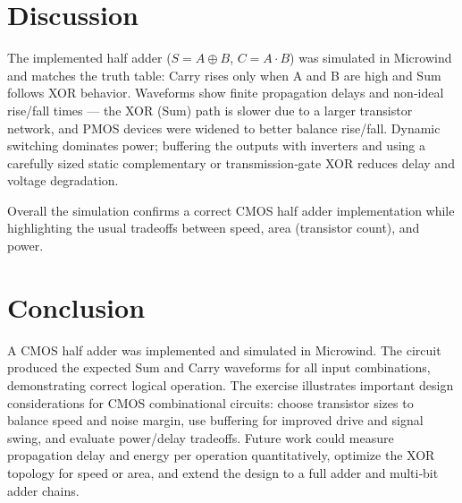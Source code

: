 \documentclass[12pt]{article}
\begin{document}
\section*{Discussion}
The implemented half adder ($S=A\oplus B$, $C=A\cdot B$) was simulated in Microwind and matches the truth table: Carry rises only when A and B are high and Sum follows XOR behavior. Waveforms show finite propagation delays and non‑ideal rise/fall times — the XOR (Sum) path is slower due to a larger transistor network, and PMOS devices were widened to better balance rise/fall. Dynamic switching dominates power; buffering the outputs with inverters and using a carefully sized static complementary or transmission‑gate XOR reduces delay and voltage degradation.

Overall the simulation confirms a correct CMOS half adder implementation while highlighting the usual tradeoffs between speed, area (transistor count), and power.

\section*{Conclusion}
A CMOS half adder was implemented and simulated in Microwind. The circuit produced the expected Sum and Carry waveforms for all input combinations, demonstrating correct logical operation. The exercise illustrates important design considerations for CMOS combinational circuits: choose transistor sizes to balance speed and noise margin, use buffering for improved drive and signal swing, and evaluate power/delay tradeoffs. Future work could measure propagation delay and energy per operation quantitatively, optimize the XOR topology for speed or area, and extend the design to a full adder and multi‑bit adder chains.



\renewcommand{\bibname}{References}

\end{document}
